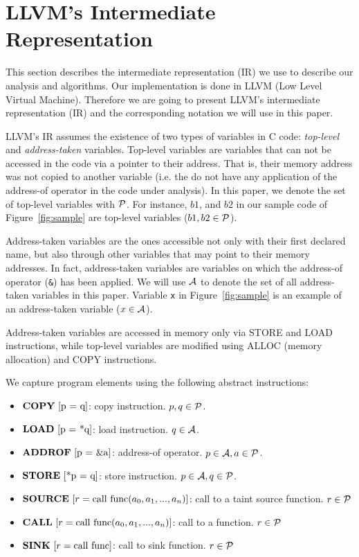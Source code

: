 \section{LLVM's Intermediate Representation}\label{sec:llvm}

This section describes the intermediate representation (IR)
we use to describe our analysis and algorithms.
Our implementation is done in LLVM \cite{Lattner:2004:LLVM}
(Low Level Virtual Machine). Therefore we are going to present
LLVM's intermediate representation (IR) and the corresponding
notation we will use in this paper.

LLVM's IR assumes the existence of two types of variables
in C code: \textit{top-level} and \textit{address-taken}
variables.
Top-level variables are variables that can not be accessed
in the code via a pointer to their address. That is,
their memory address was not copied to another variable
(i.e. the do not have any application of the address-of
operator in the code under analysis). In this paper, we
denote the set of top-level variables with $\mathcal{P}$.
For instance, $b1$, and $b2$ in our sample code of
Figure~\ref{fig:sample} are top-level
variables ($b1, b2 \in \mathcal{P}$).

Address-taken variables are the ones accessible not
only with their first declared name, but also through
other variables that may point to their memory addresses.
In fact, address-taken variables are variables on which the
address-of operator (\texttt{\&}) has been applied. We
will use $\mathcal{A}$ to denote the set of all address-taken
variables in this paper.
Variable \texttt{x} in Figure~\ref{fig:sample} is an example
of an address-taken variable ($x \in \mathcal{A}$).

Address-taken variables are accessed in memory only via
STORE and LOAD instructions, while top-level  variables
are modified using ALLOC (memory allocation) and COPY
instructions.

We capture program elements using the following abstract
instructions:
\begin{itemize}
\item $\copydef$: copy instruction. $p, q \in \mathcal{P}$.
\item $\loaddef$: load instruction. $q \in \mathcal{A}$.
\item $\addrofdef$: address-of operator. $p \in \mathcal{A}, a \in \mathcal{P}$.
\item $\storedef$: store instruction. $p \in \mathcal{A}, q \in \mathcal{P}$.
\item $\text{\textbf{SOURCE}}\ [r = \text{call}\ \text{func}(a_0, a_1, ..., a_n)]$: call to a taint source function. $r \in \mathcal{P}$
\item $\text{\textbf{CALL}}\ [r = \text{call}\ \text{func}(a_0, a_1, ..., a_n)]$: call to a function. $r \in \mathcal{P}$
\item $\text{\textbf{SINK}}\ [r = \text{call}\ \text{func}]$: call to sink function. $r \in \mathcal{P}$
\end{itemize}